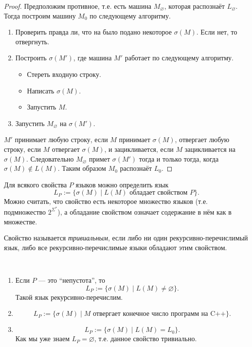 \documentclass[12pt,a4paper]{article}
\begin{document}
    \begin{proof}
        Предположим противное, т.е. есть машина $M_\varnothing$, которая распознаёт $L_\varnothing$. Тогда построим машину $M_0$ по следующему алгоритму.
        \begin{enumerate}
            \item Проверить правда ли, что на было подано некоторое $\sigma(M)$. Если нет, то отвергнуть.
            \item Построить $\sigma(M')$, где машина $M'$ работает по следующему алгоритму.
                \begin{itemize}
                    \item Стереть входную строку.
                    \item Написать $\sigma(M)$.
                    \item Запустить $M$.
                \end{itemize}
            \item Запустить $M_\varnothing$ на $\sigma(M')$.
        \end{enumerate}
        $M'$ принимает любую строку, если $M$ принимает $\sigma(M)$, отвергает любую строку, если $M$ отвергает $\sigma(M)$, и зацикливается, если $M$ зацикливается на $\sigma(M)$. Следовательно $M_\varnothing$ примет $\sigma(M')$ тогда и только тогда, когда $\sigma(M) \notin L(M)$. Таким образом $M_0$ распознаёт $L_0$.
    \end{proof}

    \begin{definition}
        Для всякого свойства $P$ языков можно определить язык
        \[L_P := \{\sigma(M) \mid \text{$L(M)$ обладает свойством $P$}\}.\]
        Можно считать, что свойство есть некоторое множество языков (т.е. подмножество $2^{\Sigma^*}$), а обладание свойством означает содержание в нём как в множестве.

        Свойство называется \emph{тривиальным}, если либо ни один рекурсивно-перечислимый язык, либо все рекурсивно-перечислимые языки обладают этим свойством.
    \end{definition}

    \begin{example}\ 
        \begin{enumerate}
            \item Если $P$ --- это ``непустота'', то
                \[L_P := \{\sigma(M) \mid L(M) \neq \varnothing\}.\]
                Такой язык рекурсивно-перечислим.
            \item
                \[L_P := \{\sigma(M) \mid \text{$M$ отвергает конечное число программ на C++}\}.\]
            \item
                \[L_P := \{\sigma(M) \mid L(M) = L_0\}.\]
                Как мы уже знаем $L_P = \varnothing$, т.е. данное свойство тривиально.
        \end{enumerate}
    \end{example}
\end{document}
